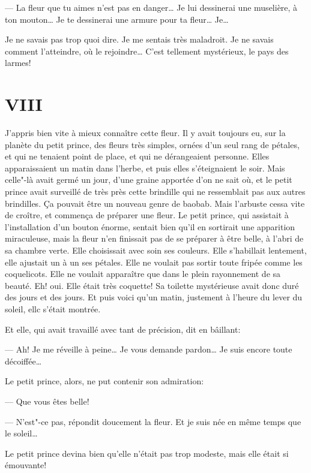 \begin{Parallel}[p]{}{}
{--- La fleur que tu aimes n'est pas en danger\ldots{} Je lui dessinerai une muselière, à ton mouton\ldots{} Je te dessinerai une armure pour ta fleur\ldots{} Je\ldots{}

Je ne savais pas trop quoi dire. Je me sentais
très maladroit. Je ne savais comment l'atteindre, où
le rejoindre\ldots{} C'est tellement mystérieux, le pays
des larmes!

\section{VIII}

J'appris bien vite à mieux connaître cette fleur. Il y
avait toujours eu, sur la planète du petit prince,
des fleurs très simples, ornées d'un seul rang de
pétales, et qui ne tenaient point de place, et qui ne dérangeaient personne. Elles apparaissaient un
matin dans l'herbe, et puis elles s'éteignaient le soir.
Mais celle"-là avait germé un jour, d'une graine
apportée d'on ne sait où, et le petit prince avait surveillé de très près cette brindille qui ne ressemblait
pas aux autres brindilles. Ça pouvait être un nouveau genre de baobab. Mais l'arbuste cessa vite de
croître, et commença de préparer une fleur. Le petit
prince, qui assistait à l'installation d'un bouton
énorme, sentait bien qu'il en sortirait une apparition miraculeuse, mais la fleur n'en finissait pas de
se préparer à être belle, à l'abri de sa chambre verte.
Elle choisissait avec soin ses couleurs. Elle s'habillait
lentement, elle ajustait un à un ses pétales. Elle ne
voulait pas sortir toute fripée comme les coquelicots.
Elle ne voulait apparaître que dans le plein rayonnement de sa beauté. Eh! oui. Elle était très coquette!
Sa toilette mystérieuse avait donc duré des jours et
des jours. Et puis voici qu'un matin, justement à
l'heure du lever du soleil, ellc s'était montrée.

Et elle, qui avait travaillé avec tant de précision,
dit en bâillant:

--- Ah! Je me réveille à peine\ldots{} Je vous demande
pardon\ldots{} Je suis encore toute décoiffée\ldots{}

Le petit prince, alors, ne put contenir son admiration:

--- Que vous êtes belle!

--- N'est"-ce pas, répondit doucement la fleur. Et je suis née en même temps que le soleil\ldots{}

Le petit prince devina bien qu'elle n'était pas trop modeste, mais elle
était si émouvante!

}
\end{Parallel}

